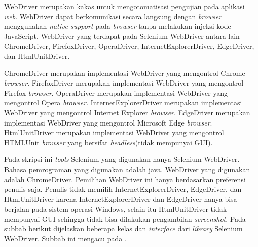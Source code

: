 WebDriver merupakan kakas untuk mengotomatisasi pengujian pada aplikasi \textit{web}\cite{Selenium_doc}. WebDriver dapat berkomunikasi secara langsung dengan \textit{browser} menggunakan \textit{native support} pada \textit{browser} tanpa melakukan injeksi kode JavaScript. WebDriver yang terdapat pada Selenium WebDriver antara lain ChromeDriver, FirefoxDriver, OperaDriver, InternetExplorerDriver, EdgeDriver, dan HtmlUnitDriver.

ChromeDriver merupakan implementasi WebDriver yang mengontrol Chrome \textit{browser}. FirefoxDriver merupakan implementasi WebDriver yang mengontrol Firefox \textit{browser}. OperaDriver merupakan implementasi WebDriver yang mengontrol Opera \textit{browser}. InternetExplorerDriver merupakan implementasi WebDriver yang mengontrol Internet Explorer \textit{browser}. EdgeDriver merupakan implementasi WebDriver yang mengontrol Microsoft Edge \textit{browser}. HtmlUnitDriver merupakan implementasi WebDriver yang mengontrol HTMLUnit \textit{browser} yang bersifat \textit{headless}(tidak mempunyai GUI). 

Pada skripsi ini \textit{tools} Selenium yang digunakan hanya Selenium WebDriver. Bahasa pemrograman yang digunakan adalah java. WebDriver yang digunakan adalah ChromeDriver. Pemilihan WebDriver ini hanya berdasarkan preferensi penulis saja. Penulis tidak memilih InternetExplorerDriver, EdgeDriver, dan HtmlUnitDriver karena InternetExplorerDriver dan EdgeDriver hanya bisa berjalan pada sistem operasi Windows, selain itu  HtmlUnitDriver tidak mempunyai GUI sehingga tidak bisa dilakukan pengambilan \textit{screenshot}. Pada subbab berikut dijelaskan beberapa kelas dan \textit{interface} dari \textit{library} Selenium WebDriver. Subbab ini mengacu pada \cite{Selenium_java_doc}.

